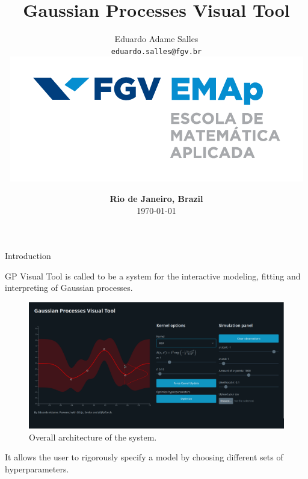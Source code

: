 \documentclass[xcolor=dvipsnames,t,aspectratio=169]{beamer} %
\title{Gaussian Processes Visual Tool} %
\author{Eduardo Adame Salles\\
{\small\texttt{eduardo.salles@fgv.br}}\\
\vspace{0.4cm} \hspace{0.2cm} \includegraphics[scale = 0.25]{emap_logo}}
\date{{\color{fgv_dark_blue}  \textbf{Rio de Janeiro, Brazil}\\ \today}}
\newcommand{\highlight}[1]{{\color{fgv_light_blue} #1}}
\begin{document}
\frame{\titlepage}


\begin{frame}[c]{Introduction}

    \begin{block}{}
    GP Visual Tool is called to be a system for the interactive modeling, fitting and interpreting of \highlight{Gaussian processes}.
    \end{block}\vspace*{1cm}

    \begin{figure}[H]
        \centering
        \includegraphics[height=.4\textheight]{../imgs/overall.png}
        \caption{Overall architecture of the system.}
    \end{figure}
    
    It allows the user to \highlight{rigorously} specify \highlight{a model} by choosing different sets of \highlight{hyperparameters}. 

\end{frame}
\end{document}
